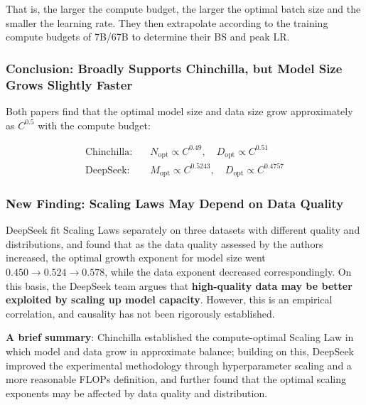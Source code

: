 \documentclass[
  english,
  11pt,
  a4paper,
]{article}
\newenvironment{NotesFormula}{%
  \par\noindent\begin{minipage}{\linewidth}%
  \setlength{\parindent}{2em}%
  \setlength{\parskip}{0.35em}%
}{\end{minipage}\par}
\begin{document}
That is, the larger the compute budget, the larger the optimal batch
size and the smaller the learning rate. They then extrapolate according
to the training compute budgets of 7B/67B to determine their BS and peak
LR.

\subsubsection{Conclusion: Broadly Supports Chinchilla, but Model Size
Grows Slightly
Faster}\label{conclusion-broadly-supports-chinchilla-but-model-size-grows-slightly-faster}

\begin{NotesFormula}

Both papers find that the optimal model size and data size grow
approximately as \(C^{0.5}\) with the compute budget:

\[\begin{aligned}
\text{Chinchilla:}\quad&N_{\mathrm{opt}}\propto C^{0.49},\quad D_{\mathrm{opt}}\propto C^{0.51}\\
\text{DeepSeek:}\quad&M_{\mathrm{opt}}\propto C^{0.5243},\quad D_{\mathrm{opt}}\propto C^{0.4757}
\end{aligned}\]

\end{NotesFormula}

\subsubsection{New Finding: Scaling Laws May Depend on Data
Quality}\label{new-finding-scaling-laws-may-depend-on-data-quality}

DeepSeek fit Scaling Laws separately on three datasets with different
quality and distributions, and found that as the data quality assessed
by the authors increased, the optimal growth exponent for model size
went \(0.450\to0.524\to0.578\), while the data exponent decreased
correspondingly. On this basis, the DeepSeek team argues that
\textbf{high-quality data may be better exploited by scaling up model
capacity}. However, this is an empirical correlation, and causality has
not been rigorously established.

\textbf{A brief summary}: Chinchilla established the compute-optimal
Scaling Law in which model and data grow in approximate balance;
building on this, DeepSeek improved the experimental methodology through
hyperparameter scaling and a more reasonable FLOPs definition, and
further found that the optimal scaling exponents may be affected by data
quality and distribution.
\end{document}
